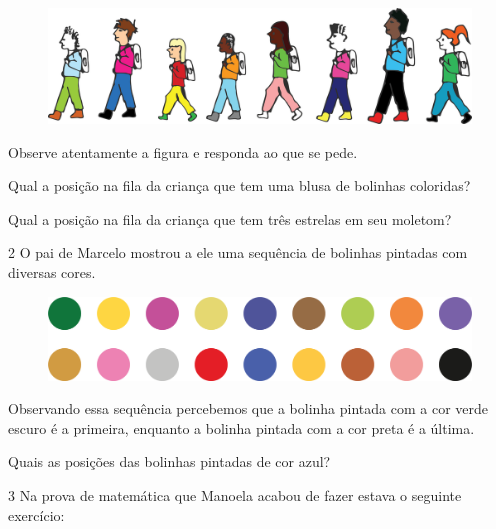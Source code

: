 \begin{figure}[htpb!]
\includegraphics[width=\textwidth]{./media/image27.png}
\end{figure}

Observe atentamente a figura e responda ao que se pede.

\begin{escolha}
\item Qual a posição na fila da criança que tem uma blusa de bolinhas coloridas?


\item Qual a posição na fila da criança que tem três estrelas em seu moletom?

\end{escolha}

\num{2} O pai de Marcelo mostrou a ele uma sequência de bolinhas pintadas com
diversas cores.

\begin{figure}[htpb!]
\includegraphics[width=\textwidth]{./media/image28.png}
\end{figure}

Observando essa sequência percebemos que a bolinha pintada com a cor
verde escuro é a primeira, enquanto a bolinha pintada com a cor preta é a
última.

Quais as posições das bolinhas pintadas de cor azul?


\num{3} Na prova de matemática que Manoela acabou de fazer estava o seguinte exercício:

